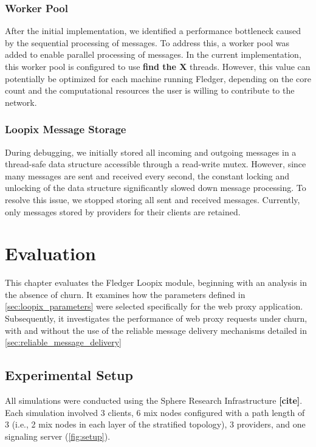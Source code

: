 \documentclass[a4paper,11pt,oneside]{report}
\begin{document}
\subsection{Worker Pool}
After the initial implementation, we identified a performance bottleneck caused by the sequential processing of messages. To address this, a worker pool was added to enable parallel processing of messages. In the current implementation, this worker pool is configured to use \textbf{find the X} threads. However, this value can potentially be optimized for each machine running Fledger, depending on the core count and the computational resources the user is willing to contribute to the network.

\subsection{Loopix Message Storage}
During debugging, we initially stored all incoming and outgoing messages in a thread-safe data structure accessible through a read-write mutex. However, since many messages are sent and received every second, the constant locking and unlocking of the data structure significantly slowed down message processing. To resolve this issue,  we stopped storing all sent and received messages. Currently, only messages stored by providers for their clients are retained.

\chapter{Evaluation}
\label{sec:eval}


This chapter evaluates the Fledger Loopix module, beginning with an analysis in the absence of churn. It examines how the parameters defined in \autoref{sec:loopix_parameters} were selected specifically for the web proxy application. Subsequently, it investigates the performance of web proxy requests under churn, with and without the use of the reliable message delivery mechanisms detailed in \autoref{sec:reliable_message_delivery}

\section{Experimental Setup}
\label{sec:setup}
All simulations were conducted using the Sphere Research Infrastructure \textbf{[cite]}. Each simulation involved 3 clients, 6 mix nodes configured with a path length of 3 (i.e., 2 mix nodes in each layer of the stratified topology), 3 providers, and one signaling server (\autoref{fig:setup}).
\end{document}
